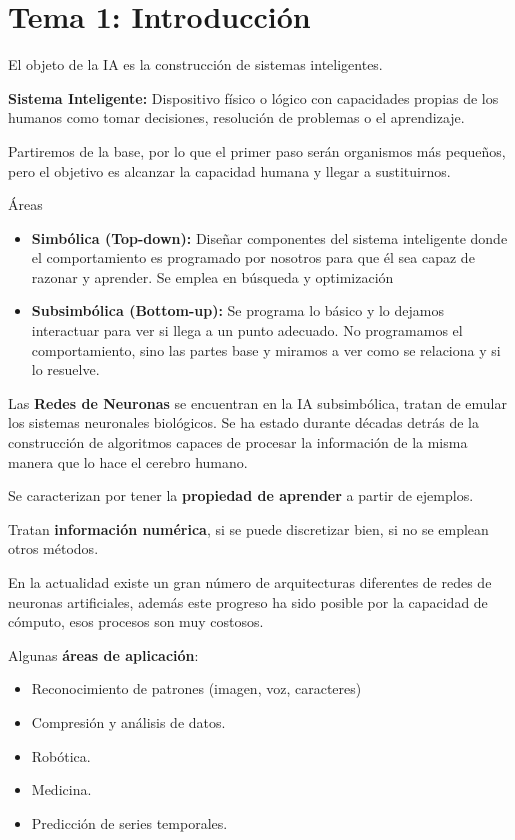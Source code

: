 \documentclass[12pt, twoside, openright]{report} %
\begin{document}
\chapter{Tema 1: Introducción}
El objeto de la IA es la construcción de sistemas inteligentes.

\textbf{Sistema Inteligente:} Dispositivo físico o lógico con capacidades propias de los humanos como tomar decisiones, resolución de problemas o el aprendizaje.

Partiremos de la base, por lo que el primer paso serán organismos más pequeños, pero el objetivo es alcanzar la capacidad humana y llegar a sustituirnos.

Áreas
\begin{itemize}
	\item \textbf{Simbólica (Top-down):} Diseñar componentes del sistema inteligente donde el comportamiento es programado por nosotros para que él sea capaz de razonar y aprender. Se emplea en búsqueda y optimización
	\item \textbf{Subsimbólica (Bottom-up):} Se programa lo básico y lo dejamos interactuar para ver si llega a un punto adecuado. No programamos el comportamiento, sino las partes base y miramos a ver como se relaciona y si lo resuelve.
\end{itemize}

Las \textbf{Redes de Neuronas} se encuentran en la IA subsimbólica, tratan de emular los sistemas neuronales biológicos. Se ha estado durante décadas detrás de la construcción de algoritmos capaces de procesar la información de la misma manera que lo hace el cerebro humano.

Se caracterizan por tener la \textbf{propiedad de aprender} a partir de ejemplos.

Tratan \textbf{información numérica}, si se puede discretizar bien, si no se emplean otros métodos.

En la actualidad existe un gran número de arquitecturas diferentes de redes de neuronas artificiales, además este progreso ha sido posible por la capacidad de cómputo, esos procesos son muy costosos.

Algunas \textbf{áreas de aplicación}:
\begin{itemize}
	\item Reconocimiento de patrones (imagen, voz, caracteres)
	\item Compresión y análisis de datos.
	\item Robótica.
	\item Medicina.
	\item Predicción de series temporales.
\end{itemize}
\end{document}
